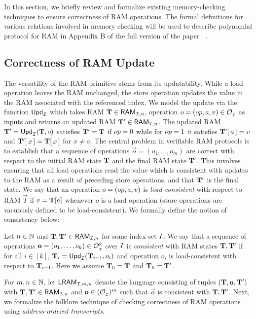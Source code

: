 In this section, we briefly review and formalize existing memory-checking techniques to ensure
correctness of RAM operations. The formal definitions for various relations involved in memory checking
will be used to describe polynomial protocol for RAM in Appendix B of the full version of the paper ~\cite{full-ver}.

\subsection{Correctness of RAM Update}\label{subsec:ram-update}
The versatility of the RAM primitive stems from its updatability. While a load operation leaves the RAM unchanged, the store operation
updates the value in the RAM associated with the referenced index. We model the update via the function
$\mathsf{Upd}_{\mathcal{I}}$ which takes RAM $\mathbf{T}\in \mathsf{RAM}_{\mathcal{I}, {n}}$, operation
$o=({op},a,v)\in \mathcal{O}_{{}_\mathcal{I}}$ as inputs and returns an updated RAM $\mathbf{T}'\in \mathsf{RAM}_{\mathcal{I}, {n}}$.
The updated RAM $\mathbf{T}'=\mathsf{Upd}_{\mathcal{I}}(\mathbf{T},o)$ satisfies
$\mathbf{T}'=\mathbf{T}$ if ${op}=0$ while for ${op}=1$ it satisfies $\mathbf{T}'[\,a\,]=v$  and $\mathbf{T}'[\,x\,]=\mathbf{T}[\,x\,]$ for $x\neq a$. The central problem
in verifiable RAM protocols is to establish that a sequence of operations $\vec{o}=(o_1,\ldots,o_m)$ are correct with
respect to the initial RAM state $\mathbf{T}$ and the final RAM state $\mathbf{T}'$. This involves ensuring
that all load operations read the value which is consistent with updates to the RAM as a result of preceding
store operations, and that $\mathbf{T}'$ is the final state. We say that an operation $o=({op},a,v)$ is {\em load-consistent}
with respect to RAM $\vec{T}$ if $v=\mathbf{T}[a]$ whenever $o$ is a load operation (store operations are vacuously defined to be load-consistent).
We formally define the notion of consistency below:

\begin{definition}\label{defn:consistent-operations}
    Let $n\in \mathbb{N}$ and $\mathbf{T},\mathbf{T}'\in \mathsf{RAM}_{\mathcal{I}, {n}}$ for some index set $I$. We say that a sequence of operations
    $\mathbf{o}=(o_1,\ldots,o_k)\in \mathcal{O}_{{}_\mathcal{I}}^k$ over $I$ is {\em consistent} with RAM states
    $\mathbf{T},\mathbf{T}'$ if for all $i\in [k]$, $\mathbf{T}_{i}=\mathsf{Upd}_{\mathcal{I}}(\mathbf{T}_{i-1},o_i)$ and operation $o_i$ is load-consistent with respect to $\mathbf{T}_{i-1}$. Here
    we assume $\mathbf{T}_0=\mathbf{T}$ and $\mathbf{T}_k=\mathbf{T}'$.
\end{definition}

For $m,n\in \mathbb{N}$, let $\mathsf{LRAM}_{\mathcal{I},m,n}$ denote the language consisting of tuples $(\mathbf{T},\mathbf{o},\mathbf{T}')$ with $\mathbf{T},\mathbf{T}'\in \mathsf{RAM}_{\mathcal{I}, {n}}$ and $\mathbf{o}\in (\mathcal{O}_{{}_\mathcal{I}})^m$
such that $\vec{o}$ is consistent with $\mathbf{T},\mathbf{T}'$.
Next, we formalize the folklore technique of checking correctness of RAM operations
using {\em address-ordered transcripts}.

